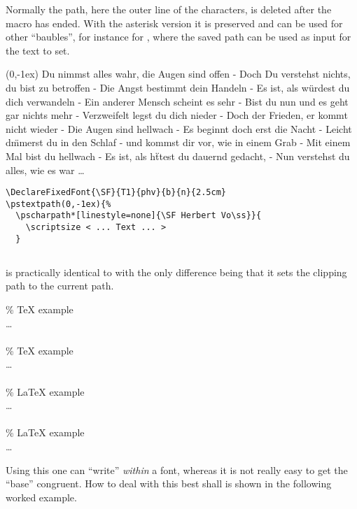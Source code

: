 \documentclass[11pt,english,BCOR10mm,DIV12,bibliography=totoc,parskip=false,smallheadings
    headexclude,footexclude,oneside]{pst-doc}
\begin{document}
\medskip\noindent
Normally the path, here the outer line of the characters, is deleted after the
macro  has ended. With the asterisk version it is preserved
and can be used for other ``baubles''{}, for instance for ,
where the saved path can be used as input for the text to set.


\medskip\noindent
{}
\begin{center}
\pstextpath(0,-1ex){}{
\scriptsize Du nimmst alles wahr, die Augen sind offen -
Doch Du verstehst nichts, du bist zu betroffen -
Die Angst bestimmt dein Handeln - 
Es ist, als w\"urdest du dich verwandeln -
Ein anderer Mensch scheint es sehr - 
Bist du nun und es geht gar nichts mehr -
Verzweifelt legst du dich nieder -
Doch der Frieden, er kommt nicht wieder -
Die Augen sind hellwach -
Es beginnt doch erst die Nacht -
Leicht d\"mmerst du in den Schlaf -
und kommst dir vor, wie in einem Grab -
Mit einem Mal bist du hellwach -
Es ist, als h\"ttest du dauernd gedacht, -
Nun verstehst du alles, wie es war \ldots
}
\end{center}

\begin{lstlisting}
\DeclareFixedFont{\SF}{T1}{phv}{b}{n}{2.5cm}
\pstextpath(0,-1ex){%
  \pscharpath*[linestyle=none]{\SF Herbert Vo\ss}}{
    \scriptsize < ... Text ... > 
  }
\end{lstlisting}

\subsection{}\label{sec:psttext:pscharclip}
 is practically identical to
 with the only difference being that it sets the clipping
path to the current path.
%
\begin{BDef}
\OptArgs{} \%  TeX example\\
\quad\ldots\\
\\
\OptArgs{}\%  TeX example\\
\quad\ldots\\
\\
\OptArgs{} \%  LaTeX example\\
\quad\ldots\\
\\
\OptArgs{}\%  LaTeX example\\
\quad\ldots\\
\end{BDef}
%
Using this one can ``write''{} \emph{within} a font, whereas it is not really
easy to get the ``base''{} congruent. How to deal with this best shall is shown
in the following worked example. 
\end{document}
